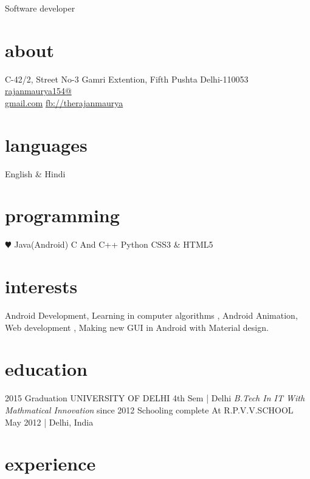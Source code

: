\documentclass[]{friggeri-cv}
\begin{document}
       {Software developer}


\begin{aside}
  \section{about}
    C-42/2, Street No-3
    Gamri Extention,
    Fifth Pushta Delhi-110053
    ~
    \href{mailto:rajanmaurya154@gmail.com}{rajanmaurya154@\\gmail.com}
    \href{http://facebook.com/therajanmaurya}{fb://therajanmaurya}
  \section{languages}
    English \& Hindi
  \section{programming}
    {\color{red} $\varheartsuit$} Java(Android)
    C And C++
    Python
    CSS3 \& HTML5
\end{aside}

\section{interests}

Android Development, Learning in computer algorithms , Android Animation, Web development , Making new GUI in Android with Material design.
 

\section{education}

\begin{entrylist}
  \entry
    {2015}
    {Graduation {\normalfont UNIVERSITY OF DELHI}}
    {4th Sem | Delhi}
    {\emph{B.Tech In IT With Mathmatical Innovation}}
  \entry
    {since 2012} 
    {Schooling complete At R.P.V.V.SCHOOL}
    {}
    {May 2012 | Delhi, India}
\end{entrylist}

\section{experience}
\end{document}
